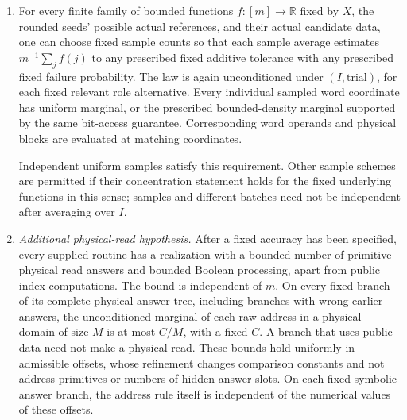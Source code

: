 \begin{definition}
\begin{enumerate}[label=\textup{(\alph*)},leftmargin=*]
The bit guarantee is unconditioned for each fixed relevant symbolic
role and branch: a request at a whole-word coordinate with density at
most a fixed constant times $1/m$ has the asserted error under its
given request law. It is not a guarantee conditional on selecting that
branch. Requests to different word operands may use the same complete
coordinate. The guarantee is required for the matching coordinate $J$
and for all preallocated statistical coordinates below. A finite union
of role or fixed block-type alternatives is allowed.
\item\label{geo:access-statistics}
For every finite family of bounded functions $f:[m]\to\mathbb R$
fixed by $X$, the rounded seeds' possible actual references, and their
actual candidate data, one can choose fixed sample counts so that each
sample average estimates $m^{-1}\sum_jf(j)$ to any prescribed fixed
additive tolerance with any prescribed fixed failure probability.
The law is again unconditioned under $(I,\text{trial})$, for each fixed
relevant role alternative. Every individual sampled word coordinate has
uniform marginal, or the prescribed bounded-density marginal supported
by the same bit-access guarantee. Corresponding word operands and
physical blocks are evaluated at matching coordinates.

Independent uniform samples satisfy this requirement. Other sample
schemes are permitted if their concentration statement holds for the
fixed underlying functions in this sense; samples and different batches
need not be independent after averaging over $I$.
\item\label{geo:access-finite}
\emph{Additional physical-read hypothesis.} After a fixed accuracy has
been specified, every supplied routine has a realization with a bounded
number of primitive physical read answers and bounded Boolean
processing, apart from public index computations. The bound is
independent of $m$. On every fixed branch of its complete physical
answer tree, including branches with wrong earlier answers, the
unconditioned marginal of each raw address in a physical domain of
size $M$ is at most $C/M$, with a fixed $C$. A branch that uses public
data need not make a physical read. These bounds hold
uniformly in admissible offsets, whose refinement changes comparison
constants and not address primitives or numbers of hidden-answer slots.
On each fixed symbolic answer branch, the address rule itself is
independent of the numerical values of these offsets.
\end{enumerate}
\end{definition}

